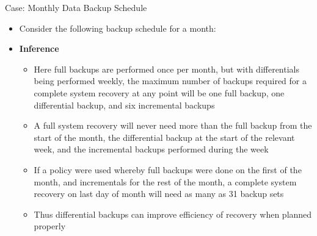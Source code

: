 \documentclass[aspectratio=169, xcolor=dvipsnames]{beamer}
\begin{document}
\begin{frame}{Case: Monthly Data Backup Schedule}
    \begin{itemize}[<+->]
        \item Consider the following backup schedule for a month:
    \end{itemize}
    \begin{itemize}[<+->]
        \item[<3->] \textbf{Inference}
        \begin{itemize}
            \item[$\triangleright$] Here full backups are performed once per month, but with differentials being performed weekly, the maximum number of backups required for a complete system recovery at any point will be one full backup, one differential backup, and six incremental backups
            \item[$\triangleright$] A full system recovery will never need more than the full backup from the start of the month, the differential backup at the start of the relevant week, and the incremental backups performed during the week
            \item[$\triangleright$] If a policy were used whereby full backups were done on the first of the month, and incrementals for the rest of the month, a complete system recovery on last day of month will need as many as 31 backup sets
            \item[$\triangleright$] Thus differential backups can improve efficiency of recovery when planned properly
        \end{itemize}
    \end{itemize}
\end{frame}
\end{document}
